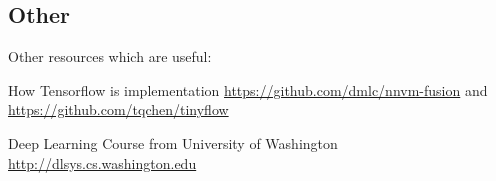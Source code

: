 \subsection{Other}

Other resources which are useful:

How Tensorflow is implementation \url{https://github.com/dmlc/nnvm-fusion} and \url{https://github.com/tqchen/tinyflow}

Deep Learning Course from University of Washington \url{http://dlsys.cs.washington.edu}
